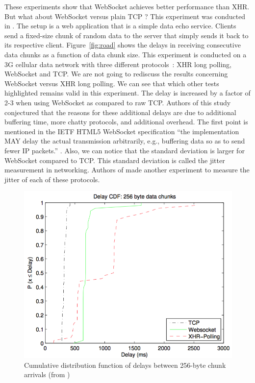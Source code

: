 \documentclass[10pt,journal,compsoc]{IEEEtran}
\newcommand{\ws}{WebSocket}
\begin{document}
These experiments show that \ws{} achieves better performance than XHR.
But what about \ws{} versus plain TCP ? 
This experiment was conducted in \cite{roadblock}.
The setup is a web application that is a simple data echo service.
Clients send a fixed-size chunk of random data to the server that simply sends it back to its respective client.
Figure~\ref{fig:road} shows the delays in receiving consecutive data chunks as a function of data chunk size. %
This experiment is conducted on a 3G cellular data network with three different \mbox{protocols :} XHR long polling, \ws{} and TCP.
We are not going to rediscuss the results concerning \ws{} versus XHR long polling.
We can see that which other tests highlighted remains valid in this experiment. %
The delay is increased by a factor of 2-3 when using \ws{} as compared to raw TCP. %
Authors of this study conjectured that the reasons for these additional delays are due to additional buffering time, more chatty protocols, and additional overhead.
The first point is mentioned in the IETF HTML5 \ws{} specification ``the implementation MAY delay the actual transmission arbitrarily, e.g., buffering data so as to send fewer IP packets.'' \cite{rfc6455}.
Also, we can notice that the standard deviation is larger for \ws{} compared to TCP.
This standard deviation is called the jitter measurement in networking.
Authors of \cite{roadblock} made another experiment to measure the jitter of each of these protocols.
\begin{figure}[!ht]
    \centering
    \includegraphics[width=\linewidth]{road_jitter.png}
    \caption{Cumulative distribution function of delays between 256-byte chunk arrivals (from \cite{roadblock})}
    \label{fig:road2}
\end{figure}
\end{document}
